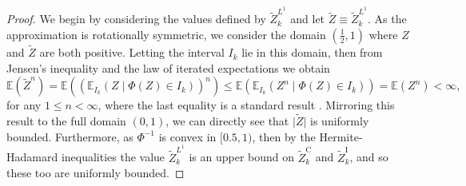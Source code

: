 \documentclass[manuscript,review]{acmart}
\begin{document}
\begin{proof}
We begin by considering the values defined by $ \tilde{Z}_k^{L^1} $ and let $ \tilde{Z} \equiv  \tilde{Z}_k^{L^1}$. As the approximation is rotationally symmetric, we consider the domain $ (\tfrac{1}{2}, 1) $ where $ Z $ and $ \tilde{Z} $ are both positive. Letting the interval $ I_k $ lie in this domain, then from Jensen's inequality and the law of iterated expectations we obtain 
\begin{equation*}
\mathbb{E}(\tilde{Z}^n) = \mathbb{E}((\mathbb{E}_{I_k}(Z \mid \Phi(Z) \in I_k))^n) \leq \mathbb{E}(\mathbb{E}_{I_k}(Z^n \mid \Phi(Z) \in I_k)) =  \mathbb{E}(Z^n) < \infty,
\end{equation*}
for any $ 1\leq n < \infty $, where the last equality is a standard result \citep[C.2]{blundell2014concepts}. Mirroring this result to the full domain $ (0, 1) $, we can directly see that $ \lvert \tilde{Z} \rvert $ is uniformly bounded. Furthermore, as $ \Phi^{-1} $ is convex in $ [0.5, 1) $, then by the Hermite-Hadamard inequalities the value $ \tilde{Z}_k^{L^1} $ is an upper bound on $ \tilde{Z}_k^\mathrm{C} $ and $ \tilde{Z}_k^\mathrm{I} $, and so these too are uniformly bounded. 


\end{proof}
\end{document}
